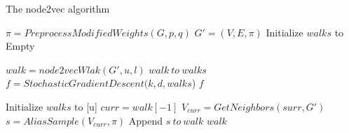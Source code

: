 \begin{algorithm}[!htbp]
    \small
    \caption{The node2vec algorithm}\label{alg:node2vec}
    \begin{algorithmic}[1]
        \State $\pi=PreprocessModifiedWeights(G,p,q)$
        \State $G'=(V,E,\pi)$
        \State Initialize $walks$ to Empty

        	\State $walk=node2vecWlak(G',u,l)$ 
        	\State $walk~to~walks$
        	\EndFor 
        \EndFor
        \State $f=StochasticGradientDescent(k,d,walks$)
        \State\Return $f$ 
        \EndFunction
    \end{algorithmic}
 
    \begin{algorithmic}[1]
        \State Initialize $walks$ to [u]
        \State $curr=walk[-1]$
        \State $V_{curr} =GetNeighbors(surr,G')$
        \State $s=AliasSample(V_{curr},\pi)$
        \State Append $s~to~walk$
        \EndFor
        \State \Return $walk$
        \EndFunction
    \end{algorithmic}

\end{algorithm}



